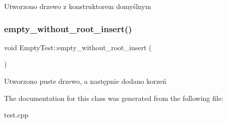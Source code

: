 Utworzono drzewo z konstruktorem domyślnym \mbox{\label{class_empty_test_ad17133b184176d9d8b0511168d13ca6b}} 
\subsubsection{\texorpdfstring{empty\+\_\+without\+\_\+root\+\_\+insert()}{empty\_without\_root\_insert()}}
{\footnotesize\ttfamily void Empty\+Test\+::empty\+\_\+without\+\_\+root\+\_\+insert (\begin{DoxyParamCaption}{ }\end{DoxyParamCaption})\hspace{0.3cm}{\ttfamily [inline]}}

Utworzono puste drzewo, a następnie dodano korzeń 

The documentation for this class was generated from the following file\+:\begin{DoxyCompactItemize}
\item 
test.\+cpp\end{DoxyCompactItemize}
